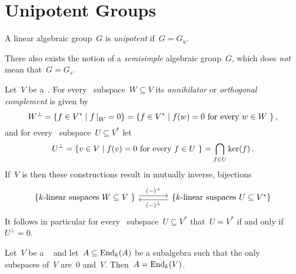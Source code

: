 \section{Unipotent Groups}


\begin{definition}
  A linear algebraic group~$G$ is \emph{unipotent} if~$G = G_u$.
\end{definition}


\begin{warning}
  There also exists the notion of a \emph{semisimple} algebraic group~$G$, which does \emph{not} mean that~$G = G_s$.
\end{warning}


\begin{recall}
  Let~$V$ be a~{\kvs}.
  For every~ subspace~$W \subseteq V$ its \emph{annihilator} or \emph{orthogonal complement} is given by
  \[
      W^\perp
    = \{
        f \in V^*
      \suchthat
        \restrict{f}{W} = 0
      \}
    = \{
        f \in V^*
      \suchthat
        \text{$f(w) = 0$ for every~$w \in W$}\ 
      \} \,,
  \]
  and for every~ subspace~$U \subseteq V^*$ let
  \[
      U^\perp
    = \{
        v \in V
      \suchthat
        \text{$f(v) = 0$ for every~$f \in U$}\ 
      \}
    = \bigcap_{f \in U} \ker(f) \,.
  \]
  If~$V$ is {\fd} then these constructions result in mutually inverse,  bijections
  \[
    \begin{tikzcd}[column sep = large]
        \{ \text{\dash{$k$}{linear} suspaces~$W \subseteq V$}\  \}
        \arrow[shift left]{r}[above]{(-)^\perp}
      & \{ \text{\dash{$k$}{linear} suspaces~$U \subseteq V^*$} \}
        \arrow[shift left]{l}[below]{(-)^\perp}
    \end{tikzcd}
  \]
  It follows in particular for every~ subspace~$U \subseteq V^*$ that~$U = V^*$ if and only if~$U^\perp = 0$.
\end{recall}


\begin{lemma}[Burnside]
  \label{burnside theorem}
  Let~$V$ be a {\fd}~{\kvs} and let~$A \subseteq \operatorname{End}_k(A)$ be a subalgebra such that the only~ subspaces of~$V$ are~$0$ and~$V$.
  Then~$A = \operatorname{End}_k(V)$.
\end{lemma}


